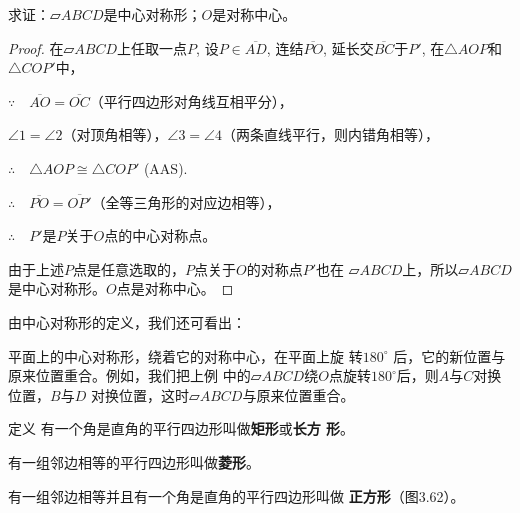 求证：$\parallelogram ABCD$是中心对称形；$O$是对称中心。

\begin{proof}
    在$\parallelogram ABCD$上任取一点$P$, 设$P\in\overline{AD}$, 连结$\overline{PO}$, 
延长交$\overline{BC}$于$P'$, 在$\triangle AOP$和$\triangle COP'$中，

$\because\quad \overline{AO}=\overline{OC}$（平行四边形对角线互相平分），

$\angle 1=\angle 2$（对顶角相等），$\angle 3=\angle 4$（两条直线平行，则内错角相等），

$\therefore\quad \triangle AOP\cong \triangle COP'$ (AAS).

$\therefore\quad \overline{PO}=\overline{OP'}$（全等三角形的对应边相等），

$\therefore\quad P'$是$P$关于$O$点的中心对称点。

由于上述$P$点是任意选取的，$P$点关于$O$的对称点$P'$也在
$\parallelogram ABCD$上，所以$\parallelogram ABCD$是中心对称形。$O$点是对称中心。
\end{proof}

由中心对称形的定义，我们还可看出：

平面上的中心对称形，绕着它的对称中心，在平面上旋
转$180^{\circ}$ 后，它的新位置与原来位置重合。例如，我们把上例
中的$\parallelogram ABCD$绕$O$点旋转$180^{\circ}$后，则$A$与$C$对换位置，$B$与$D$
对换位置，这时$\parallelogram ABCD$与原来位置重合。

\begin{blk}
    {定义} 有一个角是直角的平行四边形叫做\textbf{矩形}或\textbf{长方
形}。

有一组邻边相等的平行四边形叫做\textbf{菱形}。

有一组邻边相等并且有一个角是直角的平行四边形叫做
\textbf{正方形}（图3.62）。
\end{blk}

\begin{figure}[htp]
    \centering
{}
    \caption{}
\end{figure}

